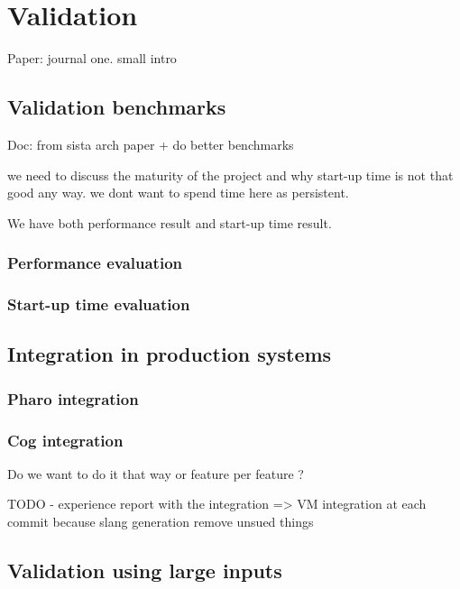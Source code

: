 \documentclass[a4paper,12pt,twoside]{../includes/ThesisStyle}
\begin{document}
\fi

\chapter{Validation}
\label{chap:validation}
\minitoc

Paper: journal one. 
small intro

\section{Validation benchmarks}

Doc: from sista arch paper + do better benchmarks

we need to discuss the maturity of the project and why start-up time is not that good any way. we dont want to spend time here as persistent.

We have both performance result and start-up time result.

\subsection{Performance evaluation}

\subsection{Start-up time evaluation}

\section{Integration in production systems}

\subsection{Pharo integration}

\subsection{Cog integration}

Do we want to do it that way or feature per feature ?

TODO - experience report with the integration
=> VM integration at each commit because slang generation remove unsued things

\section{Validation using large inputs}
\end{document}
